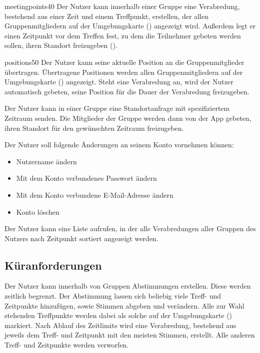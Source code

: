 \documentclass[parskip=full,11pt]{scrartcl}
\begin{document}
    {meetingpoints}{40}
%
Der Nutzer kann innerhalb einer Gruppe eine Verabredung, bestehend aus einer
Zeit und einem Treffpunkt, erstellen, der allen Gruppenmitgliedern auf der
Umgebungskarte () angezeigt wird.
Außerdem legt er einen Zeitpunkt vor dem Treffen fest,
zu dem die Teilnehmer gebeten werden sollen,
ihren Standort freizugeben ().

    {positions}{50}
%
Der Nutzer kann seine aktuelle Position an die Gruppenmitglieder übertragen.
Übertragene Positionen werden allen Gruppenmitgliedern auf der Umgebungskarte
() angezeigt.
Steht eine Verabredung an, wird der Nutzer automatisch gebeten, seine Position
für die Dauer der Verabredung freizugeben.

%
Der Nutzer kann in einer Gruppe eine Standortanfrage mit spezifiziertem
Zeitraum senden.
Die Mitglieder der Gruppe werden dann von der App gebeten,
ihren Standort für den gewünschten Zeitraum freizugeben.

%
Der Nutzer soll folgende Änderungen an seinem Konto vornehmen können:
\begin{itemize}
		\item Nutzername ändern
    \item Mit dem Konto verbundenes Passwort ändern
    \item Mit dem Konto verbundene E-Mail-Adresse ändern
    \item Konto löschen
\end{itemize}

%
%
Der Nutzer kann eine Liste aufrufen, in der alle Verabredungen aller Gruppen
des Nutzers nach Zeitpunkt sortiert angezeigt werden.

\subsection{Küranforderungen}

%
Der Nutzer kann innerhalb von Gruppen Abstimmungen erstellen.
Diese werden zeitlich begrenzt.
Der Abstimmung lassen sich beliebig viele Treff- und Zeitpunkte hinzufügen,
sowie Stimmen abgeben und verändern.
Alle zur Wahl stehenden Treffpunkte werden dabei als solche auf der
Umgebungskarte () markiert.
Nach Ablauf des Zeitlimits wird eine Verabredung, bestehend aus jeweils dem
Treff- und Zeitpunkt mit den meisten Stimmen, erstellt.
Alle anderen Treff- und Zeitpunkte werden verworfen.
\end{document}

